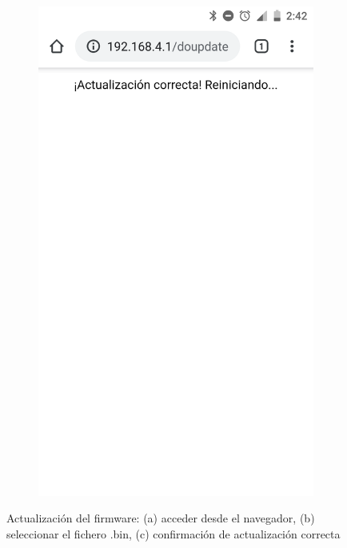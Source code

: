 \begin{figure}
\begin{subfigure}{0.32\columnwidth}
  \includegraphics[width=1\columnwidth,frame]{images/interior-firmware-update-done}
  \caption{}
  \label{fig:interior-firmware-update-done}
\end{subfigure}
\caption{Actualización del firmware: (a) acceder desde el navegador, (b) seleccionar el fichero .bin, (c) confirmación de actualización correcta}
\end{figure}

